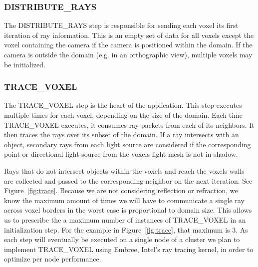 \subsubsection{DISTRIBUTE\_RAYS}

The DISTRIBUTE\_RAYS step is responsible for sending each voxel its
first iteration of ray information. This is an empty set of data for
all voxels except the voxel containing the camera if the camera is
positioned within the domain. If the camera is outside the domain
(e.g. in an orthographic view), multiple voxels may be initialized.

\subsubsection{TRACE\_VOXEL}

The TRACE\_VOXEL step is the heart of the application. This step
executes multiple times for each voxel, depending on the size of the
domain. Each time TRACE\_VOXEL executes, it consumes ray packets from
each of its neighbors. It then traces the rays over its subset of the
domain. If a ray intersects with an object, secondary rays from each
light source are considered if the corresponding point or directional
light source from the voxels light mesh is not in shadow.

Rays that do not intersect objects within the voxels and reach the
voxels walls are collected and passed to the corresponding neighbor on
the next iteration. See Figure~\ref{fig:trace}. Because we are not
considering reflection or refraction, we know the maximum amount of
times we will have to communicate a single ray across voxel borders in
the worst case is proportional to domain size. This allows us to
prescribe the a maximum number of instances of TRACE\_VOXEL in an
initialization step. For the example in Figure~\ref{fig:trace}, that
maximum is 3. As each step will eventually be executed on a single
node of a cluster we plan to implement TRACE\_VOXEL using Embree,
Intel’s ray tracing kernel, in order to optimize per node performance.

